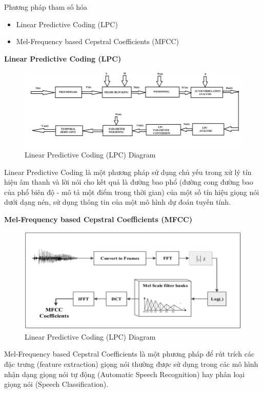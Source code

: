\documentclass{article}
\begin{document}
	Phương pháp tham số hóa
	\begin{itemize}
		\item Linear Predictive Coding (LPC) 
		\item Mel-Frequency based Cepstral Coefficients (MFCC)
	\end{itemize}
	\textbf{Linear Predictive Coding (LPC)}
	\begin{figure}[H]
		\centering
		\includegraphics[width=1\linewidth]{images/Block-diagram-of-LPC-Linear-Predictive-Coding.png}
		\caption{Linear Predictive Coding (LPC) Diagram}
		\label{fig:writing-thesis}
	\end{figure}

	Linear Predictive Coding là một phương pháp sử dụng chủ yếu trong xử lý tín hiệu âm thanh và lời nói cho kết quả là đường bao phổ (đường cong đường bao của phổ biên độ - mô tả một điểm trong thời gian) của một số tín hiệu giọng nói dưới dạng nén, sử dụng thông tin của một mô hình dự đoán tuyến tính.

	\textbf{Mel-Frequency based Cepstral Coefficients (MFCC)}
	\begin{figure}[H]
		\centering
		\includegraphics[width=1\linewidth]{images/Extraction-Mel-frequency-cepstral-coefficients-MFCC-from-the-audio-recording-signals.png}
		\caption{Linear Predictive Coding (LPC) Diagram}
		\label{fig:writing-thesis}
	\end{figure}

	Mel-Frequency based Cepstral Coefficients là một phương pháp để rút trích các đặc trưng (feature extraction) giọng nói thường được sử dụng trong các mô hình nhận dạng giọng nói tự động (Automatic Speech Recognition) hay phân loại giọng nói (Speech Classification).
	
\end{document}
